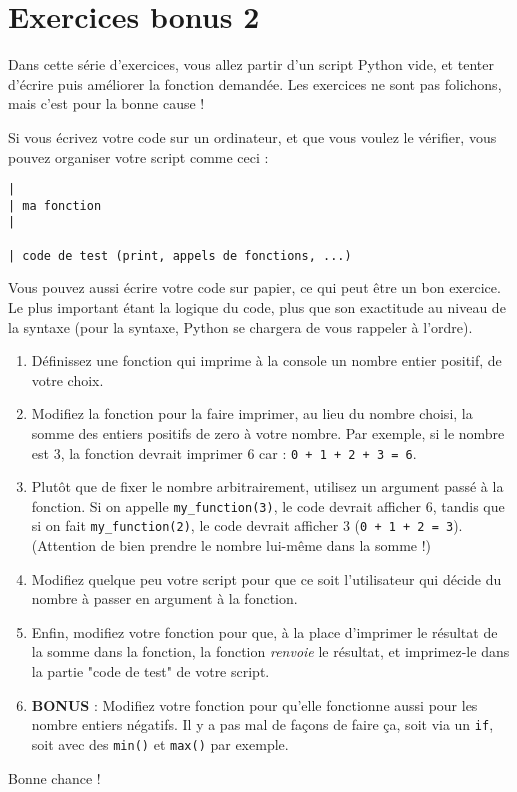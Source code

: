 \documentclass[12pt,a4paper]{article}
\newcommand{\codeintext}[1]{\texttt{#1}}
\begin{document}
\section*{Exercices bonus 2}

Dans cette série d'exercices, vous allez partir d'un script Python vide, et tenter d'écrire puis améliorer la fonction demandée. Les exercices ne sont pas folichons, mais c'est pour la bonne cause !

Si vous écrivez votre code sur un ordinateur, et que vous voulez le vérifier, vous pouvez organiser votre script comme ceci :\\

\begin{lstlisting}
|
| ma fonction
|

| code de test (print, appels de fonctions, ...)
\end{lstlisting}

Vous pouvez aussi écrire votre code sur papier, ce qui peut être un bon exercice. Le plus important étant la logique du code, plus que son exactitude au niveau de la syntaxe (pour la syntaxe, Python se chargera de vous rappeler à l'ordre).

\begin{enumerate}

\item Définissez une fonction qui imprime à la console un nombre entier positif, de votre choix.

\item Modifiez la fonction pour la faire imprimer, au lieu du nombre choisi, la somme des entiers positifs de zero à votre nombre. Par exemple, si le nombre est 3, la fonction devrait imprimer 6 car : \codeintext{0 + 1 + 2 + 3 = 6}.

\item Plutôt que de fixer le nombre arbitrairement, utilisez un argument passé à la fonction. Si on appelle \codeintext{my\_function(3)}, le code devrait afficher 6, tandis que si on fait \codeintext{my\_function(2)}, le code devrait afficher 3 (\codeintext{0 + 1 + 2 = 3}). (Attention de bien prendre le nombre lui-même dans la somme !)

\item Modifiez quelque peu votre script pour que ce soit l'utilisateur qui décide du nombre à passer en argument à la fonction.

\item Enfin, modifiez votre fonction pour que, à la place d'imprimer le résultat de la somme dans la fonction, la fonction \emph{renvoie} le résultat, et imprimez-le dans la partie "code de test" de votre script.

\item \textbf{BONUS} : Modifiez votre fonction pour qu'elle fonctionne aussi pour les nombre entiers négatifs. Il y a pas mal de façons de faire ça, soit via un \codeintext{if}, soit avec des \codeintext{min()} et \codeintext{max()} par exemple. 

\end{enumerate}

Bonne chance !
\end{document}
